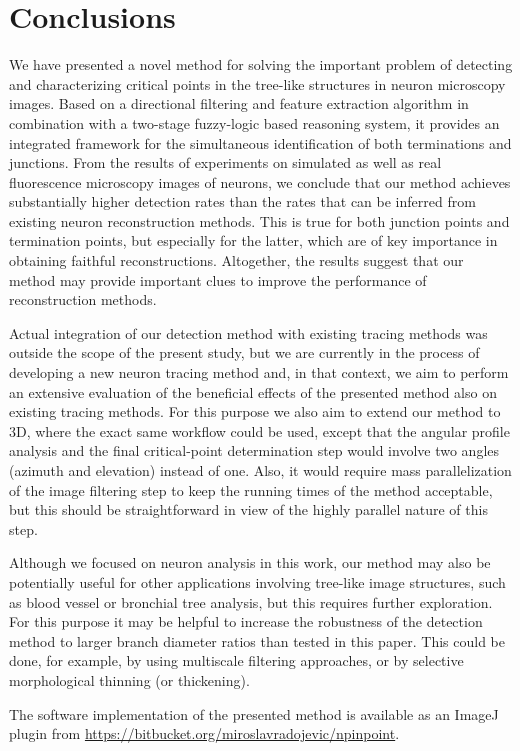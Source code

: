 \section{Conclusions} 
\label{sec:conclusions}
We have presented a novel method for solving the important problem of detecting and characterizing critical points in the tree-like structures in neuron microscopy images. Based on a directional filtering and feature extraction algorithm in combination with a two-stage fuzzy-logic based reasoning system, it provides an integrated framework for the simultaneous identification of both terminations and junctions. From the results of experiments on simulated as well as real fluorescence microscopy images of neurons, we conclude that our method achieves substantially higher detection rates than the rates that can be inferred from existing neuron reconstruction methods. This is true for both junction points and termination points, but especially for the latter, which are of key importance in obtaining faithful reconstructions. Altogether, the results suggest that our method may provide important clues to improve the performance of reconstruction methods.

Actual integration of our detection method with existing tracing methods was outside the scope of the present study, but we are currently in the process of developing a new neuron tracing method and, in that context, we aim to perform an extensive evaluation of the beneficial effects of the presented method also on existing tracing methods. For this purpose we also aim to extend our method to 3D, where the exact same workflow could be used, except that the angular profile analysis and the final critical-point determination step would involve two angles (azimuth and elevation) instead of one. Also, it would require mass parallelization of the image filtering step to keep the running times of the method acceptable, but this should be straightforward in view of the highly parallel nature of this step.

Although we focused on neuron analysis in this work, our method may also be potentially useful for other applications involving tree-like image structures, such as blood vessel or bronchial tree analysis, but this requires further exploration. For this purpose it may be helpful to increase the robustness of the detection method to larger branch diameter ratios than tested in this paper. This could be done, for example, by using multiscale filtering approaches, or by selective morphological thinning (or thickening).

The software implementation of the presented method is available as an ImageJ plugin from \url{https://bitbucket.org/miroslavradojevic/npinpoint}.



